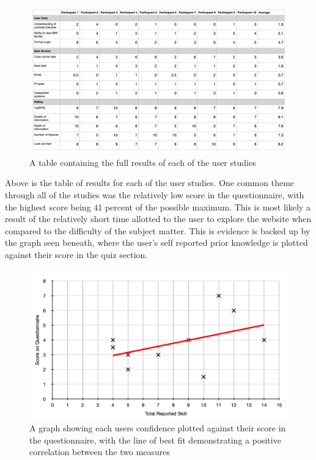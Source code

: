 \documentclass{l4proj}
\begin{document}
\begin{figure}[h!]
    \centering
    \includegraphics[width=1.0\linewidth]{dissertation/images/results_table.png}
    \caption{A table containing the full results of each of the user studies}
    \label{fig:enter-label}
\end{figure}

Above is the table of results for each of the user studies.  One common theme through all of the studies was the relatively low score in the questionnaire, with the highest score being 41 percent of the possible maximum.  This is most likely a result of the relatively short time allotted to the user to explore the website when compared to the difficulty of the subject matter.  This is evidence is backed up by the graph seen beneath, where the user's self reported prior knowledge is plotted against their score in the quiz section.

\begin{figure}[h!]
    \centering
    \includegraphics[width=1\linewidth]{dissertation/images/skill_against_score.png}
    \caption{A graph showing each users confidence plotted against their score in the questionnaire, with the line of best fit demonstrating a positive correlation between the two measures}
    \label{fig:enter-label}
\end{figure}    
\end{document}
